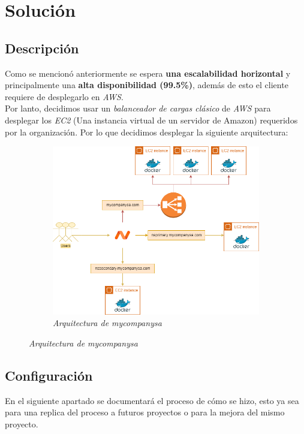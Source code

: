 \section{Solución}

\subsection{Descripción}
Como se mencionó anteriormente se espera \textbf{una escalabilidad horizontal} y
principalmente una \textbf{alta disponibilidad (99.5\%)}, además de esto el
cliente requiere de desplegarlo en \textit{AWS}. \\

Por lanto, decidimos usar un \textit{balanceador de cargas clásico} de
\textit{AWS} para desplegar los \textit{EC2} (Una instancia virtual de un
servidor de Amazon) requeridos por la organización. Por lo que decidimos
desplegar la siguiente arquitectura:

\begin{figure}[H]
    \centering
    \begin{subfigure}[b]{0.8\textwidth}
        \centering
        \includegraphics[width=\textwidth]{Figures/0. General/mycompanysa_architecture.png}
        \caption{\textit{Arquitectura de mycompanysa}}
        \label{fig: mycompanysa architecture}
    \end{subfigure}
\end{figure}

\subsection{Configuración}
En el siguiente apartado se documentará el proceso de cómo se hizo, esto ya sea
para una replica del proceso a futuros proyectos o para la mejora del mismo 
proyecto. \\

